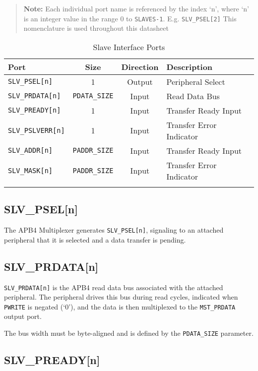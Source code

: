\begin{quote}
	
	\textbf{Note:} Each individual port name is referenced by the index `n', where `n' is
	an integer value in the range 0 to \texttt{SLAVES-1}. E.g. \texttt{SLV\_PSEL[2]}		
	This nomenclature is used throughout this datasheet
	
\end{quote}

\begin{longtable}[]{@{}lccl@{}}
	\toprule
		Port & Size & Direction & Description\tabularnewline
	\midrule
	\endhead
		\texttt{SLV\_PSEL[n]}    & 1           & Output & Peripheral Select\tabularnewline
		\texttt{SLV\_PRDATA[n]}  & \texttt{PDATA\_SIZE} & Input  & Read Data Bus\tabularnewline
		\texttt{SLV\_PREADY[n]}  & 1           & Input  & Transfer Ready Input\tabularnewline
		\texttt{SLV\_PSLVERR[n]} & 1           & Input  & Transfer Error Indicator\tabularnewline
		\texttt{SLV\_ADDR[n]}    & \texttt{PADDR\_SIZE} & Input  & Transfer Ready Input\tabularnewline
		\texttt{SLV\_MASK[n]}    & \texttt{PADDR\_SIZE} & Input  & Transfer Error Indicator\tabularnewline
	\bottomrule
	\caption{Slave Interface Ports}
\end{longtable}

\subsection{SLV\_PSEL[n]}\label{slv_pseln}

The APB4 Multiplexer generates \texttt{SLV\_PSEL[n]}, signaling to an
attached peripheral that it is selected and a data transfer is pending.

\subsection{SLV\_PRDATA[n]}\label{slv_prdatan}

\texttt{SLV\_PRDATA[n]} is the APB4 read data bus associated with the
attached peripheral. The peripheral drives this bus during read cycles,
indicated when \texttt{PWRITE} is negated (`0'), and the data is then multiplexed
to the \texttt{MST\_PRDATA} output port.

The bus width must be byte-aligned and is defined by the \texttt{PDATA\_SIZE}
parameter.

\subsection{SLV\_PREADY[n]}\label{slv_preadyn}

